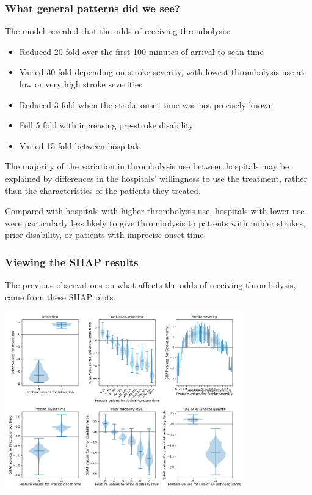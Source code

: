 \documentclass{beamer}
\begin{document}
\begin{frame}
\frametitle{What general patterns did we see?}

The  model revealed that the odds of receiving thrombolysis:
\vspace{1mm}
\begin{itemize}
    \item Reduced 20 fold over the first 100 minutes of arrival-to-scan time
    \item Varied 30 fold depending on stroke severity, with lowest thrombolysis use at low or very high stroke severities
    \item Reduced 3 fold when the stroke onset time was not precisely known
    \item Fell 5 fold with increasing pre-stroke disability
    \item Varied 15 fold between hospitals
\end{itemize}

\vspace{2mm}

The majority of the variation in thrombolysis use between hospitals may be explained by differences in the hospitals’ willingness to use the treatment, rather than the characteristics of the patients they treated.

\vspace{2mm}

Compared with hospitals with higher thrombolysis use, hospitals with lower use were particularly less likely to give thrombolysis to patients with milder strokes, prior disability, or patients with imprecise onset time.

\end{frame}


\begin{frame}
\frametitle{Viewing the SHAP results}
The previous observations on what affects the odds of receiving thrombolysis, came from these SHAP plots.
\begin{center}
\includegraphics[width=0.78\textwidth]{./images/03_xgb_10_features_thrombolysis_shap_violin}
\end{center}
\end{frame}
\end{document}
